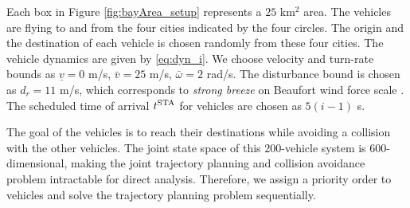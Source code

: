 Each box in Figure \ref{fig:bayArea_setup} represents a $25$ km$^2$ area. The vehicles are flying to and from the four cities indicated by the four circles. The origin and the destination of each vehicle is chosen randomly from these four cities. The vehicle dynamics are given by \eqref{eq:dyn_i}. We choose velocity and turn-rate bounds as $\underline{v} = 0$ m/s, $\bar{v} = 25$ m/s, $\bar\omega = 2$ rad/s. The disturbance bound is chosen as $d_{r} = 11$ m/s, which corresponds to \textit{strong breeze} on Beaufort wind force scale \cite{Windscale}. The scheduled time of arrival $t^\text{STA}$ for vehicles are chosen as $5(i-1)$ s.

The goal of the vehicles is to reach their destinations while avoiding a collision with the other vehicles. The joint state space of this 200-vehicle system is 600-dimensional, making the joint trajectory planning and collision avoidance problem intractable for direct analysis. Therefore, we assign a priority order to vehicles and solve the trajectory planning problem sequentially.